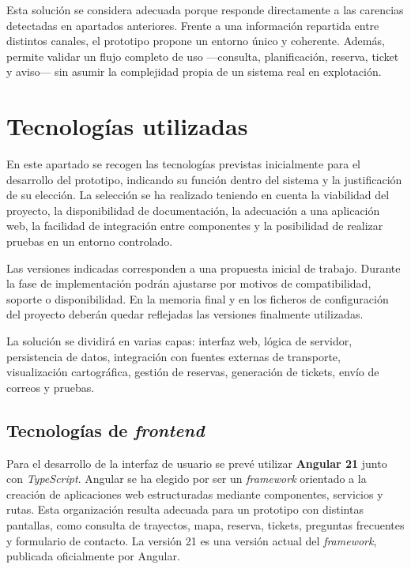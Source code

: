 Esta solución se considera adecuada porque responde directamente a las carencias detectadas en apartados anteriores. Frente a una información repartida entre distintos canales, el prototipo propone un entorno único y coherente. Además, permite validar un flujo completo de uso ---consulta, planificación, reserva, ticket y aviso--- sin asumir la complejidad propia de un sistema real en explotación.


\section{Tecnologías utilizadas}
\label{sec:tecnologias}

En este apartado se recogen las tecnologías previstas inicialmente para el desarrollo del prototipo, indicando su función dentro del sistema y la justificación de su elección. La selección se ha realizado teniendo en cuenta la viabilidad del proyecto, la disponibilidad de documentación, la adecuación a una aplicación web, la facilidad de integración entre componentes y la posibilidad de realizar pruebas en un entorno controlado.

Las versiones indicadas corresponden a una propuesta inicial de trabajo. Durante la fase de implementación podrán ajustarse por motivos de compatibilidad, soporte o disponibilidad. En la memoria final y en los ficheros de configuración del proyecto deberán quedar reflejadas las versiones finalmente utilizadas.

La solución se dividirá en varias capas: interfaz web, lógica de servidor, persistencia de datos, integración con fuentes externas de transporte, visualización cartográfica, gestión de reservas, generación de tickets, envío de correos y pruebas.

\subsection{Tecnologías de \textit{frontend}}

Para el desarrollo de la interfaz de usuario se prevé utilizar \textbf{Angular 21} junto con \textit{TypeScript}. Angular se ha elegido por ser un \textit{framework} orientado a la creación de aplicaciones web estructuradas mediante componentes, servicios y rutas. Esta organización resulta adecuada para un prototipo con distintas pantallas, como consulta de trayectos, mapa, reserva, tickets, preguntas frecuentes y formulario de contacto. La versión 21 es una versión actual del \textit{framework}, publicada oficialmente por Angular.

